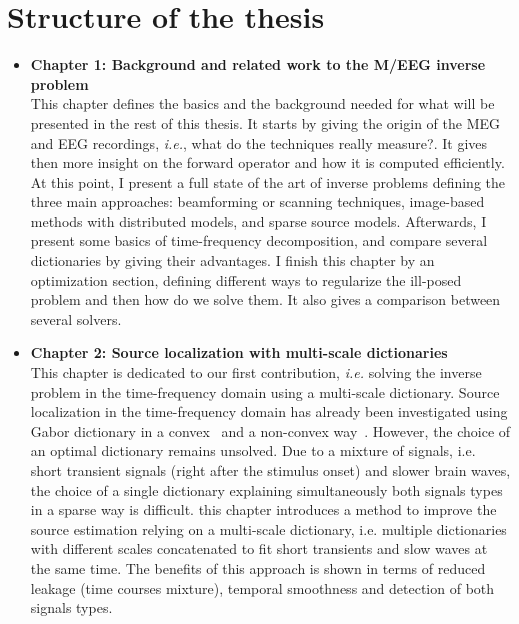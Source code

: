 \section*{Structure of the thesis}
\begin{itemize}
\item \textbf{Chapter 1: Background and related work to the
M/EEG inverse problem}\\
This chapter defines the basics and the background needed for what will be presented in the rest of this thesis. It starts by giving the origin of the MEG and EEG recordings, \textit{i.e.}, what do the techniques really measure?. It gives then more insight on the forward operator and how it is computed efficiently. At this point, I present a full state of the art of inverse problems defining the three main approaches: beamforming or scanning techniques, image-based methods with distributed models, and sparse source models. Afterwards, I present some basics of time-frequency decomposition, and compare several dictionaries by giving their advantages. I finish this chapter by an optimization section, defining different ways to regularize the ill-posed problem and then how do we solve them. It also gives a comparison between several solvers.\\

\item \textbf{Chapter 2: Source localization with multi-scale dictionaries}\\
This chapter is dedicated to our first contribution, \textit{i.e.} solving the inverse problem in the time-frequency domain using a multi-scale dictionary. 
Source localization in the time-frequency domain has already been investigated using Gabor dictionary in a convex~\cite{Gramfort_Strohmeier_Haueisen_Hamalainen_Kowalski13} and a non-convex way~\cite{Strohmeier-etal:2015}. However, the choice of an optimal dictionary remains unsolved. Due to a mixture of signals, i.e. short transient signals (right after the stimulus onset) and slower brain waves, the choice of a single dictionary explaining simultaneously both signals types in a sparse way is difficult. this chapter introduces a method to improve the source estimation relying on a multi-scale dictionary, i.e. multiple dictionaries with different scales concatenated to fit short transients and slow waves at the same time. The benefits of this approach is shown in terms of reduced leakage (time courses mixture), temporal smoothness and detection of both signals types.



\end{itemize}
